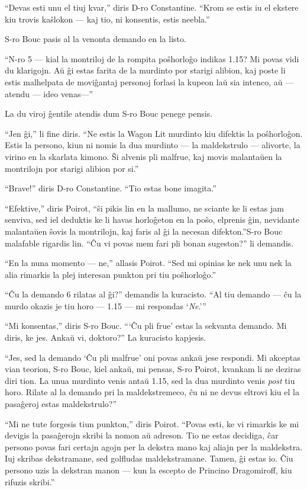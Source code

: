 ``Devas esti unu el tiuj kvar,'' diris D-ro Constantine. ``Krom se estis iu el ekstere kiu trovis kaŝlokon --- kaj tio, ni konsentis, estis neebla.''

S-ro Bouc pasis al la venonta demando en la listo.

``N-ro 5 --- kial la montriloj de la rompita poŝhorloĝo indikas 1.15? Mi povas vidi du klarigojn. Aŭ ĝi estas farita de la murdinto por starigi alibion, kaj poste li estis malhelpata de moviĝantaj personoj forlasi la kupeon laŭ sia intenco, aŭ --- atendu --- ideo venas---''

La du viroj ĝentile atendis dum S-ro Bouc penege pensis.

``Jen ĝi,'' li fine diris. ``Ne estis la Wagon Lit murdinto kiu difektis la poŝhorloĝon. Estis la persono, kiun ni nomis la dua murdinto --- la maldekstrulo --- alivorte, la virino en la skarlata kimono. Ŝi alvenis pli malfrue, kaj movis malantaŭen la montrilojn por starigi alibion por si.''

``Brave!'' diris D-ro Constantine. ``Tio estas bone imagita.''

``Efektive,'' diris Poirot, ``ŝi pikis lin en la mallumo, ne sciante ke li estas jam senviva, sed iel deduktis ke li havas horloĝeton en la poŝo, elprenis ĝin, nevidante malantaŭen ŝovis la montrilojn, kaj faris al ĝi la necesan difekton.''S-ro Bouc malafable rigardis lin. ``Ĉu vi povas mem fari pli bonan sugeston?'' li demandis.

``En la nuna momento --- ne,'' allasis Poirot. ``Sed mi opinias ke nek unu nek la alia rimarkis la plej interesan punkton pri tiu poŝhorloĝo.''

``Ĉu la demando 6 rilatas al ĝi?'' demandis la kuracisto. ``Al tiu demando --- ĉu la murdo okazis je tiu horo --- 1.15 --- mi respondas `\emph{Ne}.'''

``Mi konsentas,'' diris S-ro Bouc. ```Ĉu pli frue' estas la sekvanta demando. Mi diris, ke jes. Ankaŭ vi, doktoro?'' La kuracisto kapjesis.

``Jes, sed la demando `Ĉu pli malfrue' oni povas ankaŭ jese respondi. Mi akceptas vian teorion, S-ro Bouc, kiel ankaŭ, mi pensas, S-ro Poirot, kvankam li ne deziras diri tion. La unua murdinto venis antaŭ 1.15, sed la dua murdinto venis \emph{post} tiu horo. Rilate al la demando pri la maldekstremeco, ĉu ni ne devus eltrovi kiu el la pasaĝeroj estas maldekstrulo?''

``Mi ne tute forgesis tiun punkton,'' diris Poirot. ``Povas esti, ke vi rimarkis ke mi devigis la pasaĝerojn skribi la nomon aŭ adreson. Tio ne estas decidiga, ĉar persono povas fari certajn agojn per la dekstra mano kaj aliajn per la maldekstra. Iuj skribas dekstramane, sed golfludas maldekstramane. Tamen, ĝi estas io. Ĉiu persono uzis la dekstran manon --- kun la escepto de Princino Dragomiroff, kiu rifuzis skribi.''

